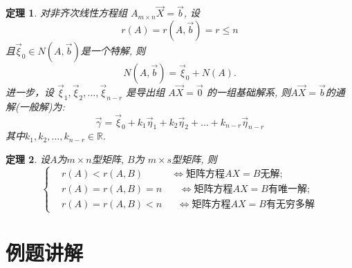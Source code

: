\documentclass[a4paper]{book}
\newtheorem{thm}{定理}[chapter]
\begin{document}
\begin{thm}
对非齐次线性方程组 $A_{m\times n}\vec{X}=\vec{b}$,  设 $$r(A)=r(A,\vec{b})=r \leq n$$
且$\vec{\xi}_0\in  N(A, \vec{b})$是一个特解, 则
$$N(A,\vec{b})=\vec{\xi}_0+N(A).$$
进一步，设 $\vec{\xi}_1, \vec{\xi}_2,\dots,\vec{\xi}_{n-r}$ 是导出组 $A\vec{X}=\vec{0}$ 的一组基础解系, 则$A\vec{X}=\vec{b}$的通解(一般解)为:
$$\vec{\gamma}=\vec{\xi}_0+k_1\vec{\eta}_1+k_2\vec{\eta}_2+\dots+k_{n-r}\vec{\eta}_{n-r}$$
其中$k_1, k_2,\dots,k_{n-r}\in\mathbb{R}.$
\end{thm}

\begin{thm}
设$A$为$m\times n$型矩阵, $B$为 $m\times s$型矩阵, 则
\begin{displaymath}\left\{\begin{aligned}
&r(A)<r(A,B)\ \ \ \ \ \ \ \ \ \ \ \ \ \Leftrightarrow \mbox{矩阵方程}AX=B\mbox{无解};\\
&r(A)=r(A,B)=n\ \ \ \ \ \ \ \ \Leftrightarrow \mbox{矩阵方程}AX=B\mbox{有唯一解};\\
&r(A)=r(A,B)<n\ \ \ \ \ \ \ \Leftrightarrow \mbox{矩阵方程}AX=B\mbox{有无穷多解}\end{aligned}\right.\end{displaymath}
\end{thm}


\section{例题讲解}
\end{document}
